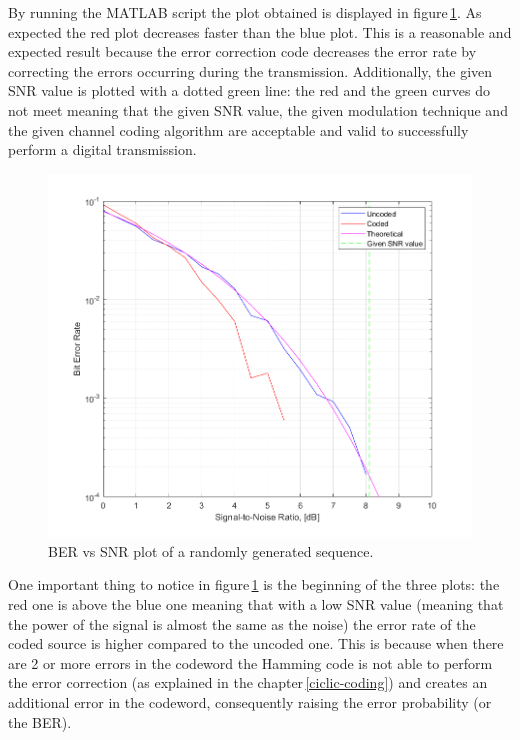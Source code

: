 \noindent By running the MATLAB script the plot obtained is displayed in figure\,\ref{fig:BER-plot}. As expected the red plot decreases faster than the blue plot. This is a reasonable and expected result because the error correction code decreases the error rate by correcting the errors occurring during the transmission. Additionally, the given SNR value is plotted with a dotted green line: the red and the green curves do not meet meaning that the given SNR value, the given modulation technique and the given channel coding algorithm are acceptable and valid to successfully perform a digital transmission. 

\begin{figure}[h]
    \centering
    \includegraphics[width = \textwidth]{../res/imgs/BER-plot.png}
    \caption{BER vs SNR plot of a randomly generated sequence.}
    \label{fig:BER-plot}
\end{figure}

One important thing to notice in figure\,\ref{fig:BER-plot} is the beginning of the three plots: the red one is above the blue one meaning that with a low SNR value (meaning that the power of the signal is almost the same as the noise) the error rate of the coded source is higher compared to the uncoded one. This is because when there are 2 or more errors in the codeword the Hamming code is not able to perform the error correction (as explained in the chapter\,\ref{ciclic-coding}) and creates an additional error in the codeword, consequently raising the error probability (or the BER).
